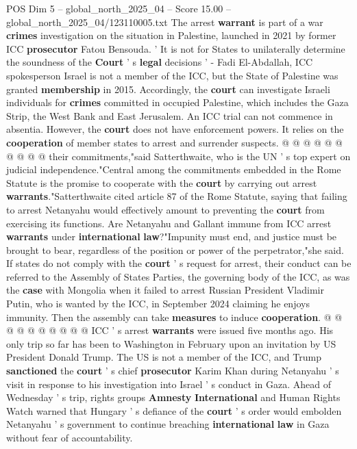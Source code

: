 \begin{textsample}{POS Dim 5 – global\_north\_2025\_04 – Score 15.00 – global\_north\_2025\_04/123110005.txt}
The arrest \textbf{warrant} is part of a war \textbf{crimes} investigation on the situation in Palestine, launched in 2021 by former ICC \textbf{prosecutor} Fatou Bensouda. ' It is not for States to unilaterally determine the soundness of the \textbf{Court} ' s \textbf{legal} decisions ' - Fadi El-Abdallah, ICC spokesperson Israel is not a member of the ICC, but the State of Palestine was granted \textbf{membership} in 2015.
Accordingly, the \textbf{court} can investigate Israeli individuals for \textbf{crimes} committed in occupied Palestine, which includes the Gaza Strip, the West Bank and East Jerusalem.
An ICC trial can not commence in absentia.
However, the \textbf{court} does not have enforcement powers.
It relies on the \textbf{cooperation} of member states to arrest and surrender suspects. @ @ @ @ @ @ @ @ @ @ their commitments,"said Satterthwaite, who is the UN ' s top expert on judicial independence."Central among the commitments embedded in the Rome Statute is the promise to cooperate with the \textbf{court} by carrying out arrest \textbf{warrants}."Satterthwaite cited article 87 of the Rome Statute, saying that failing to arrest Netanyahu would effectively amount to preventing the \textbf{court} from exercising its functions.
Are Netanyahu and Gallant immune from ICC arrest \textbf{warrants} under \textbf{international} \textbf{law}?"Impunity must end, and justice must be brought to bear, regardless of the position or power of the perpetrator,"she said.
If states do not comply with the \textbf{court} ' s request for arrest, their conduct can be referred to the Assembly of States Parties, the governing body of the ICC, as was the \textbf{case} with Mongolia when it failed to arrest Russian President Vladimir Putin, who is wanted by the ICC, in September 2024 claiming he enjoys immunity.
Then the assembly can take \textbf{measures} to induce \textbf{cooperation}. @ @ @ @ @ @ @ @ @ @ ICC ' s arrest \textbf{warrants} were issued five months ago.
His only trip so far has been to Washington in February upon an invitation by US President Donald Trump.
The US is not a member of the ICC, and Trump \textbf{sanctioned} the \textbf{court} ' s chief \textbf{prosecutor} Karim Khan during Netanyahu ' s visit in response to his investigation into Israel ' s conduct in Gaza.
Ahead of Wednesday ' s trip, rights groups \textbf{Amnesty} \textbf{International} and Human Rights Watch warned that Hungary ' s defiance of the \textbf{court} ' s order would embolden Netanyahu ' s government to continue breaching \textbf{international} \textbf{law} in Gaza without fear of accountability.

\end{textsample}
